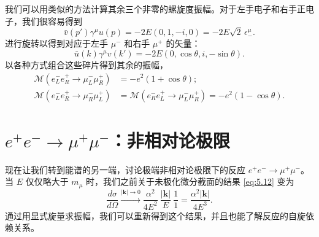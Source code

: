 我们可以用类似的方法计算其余三个非零的螺旋度振幅。对于左手电子和右手正电子，我们很容易得到
\begin{equation}
  \bar{v}(p')\gamma^\mu u(p) = -2E(0, 1, -i, 0) = -2E\sqrt{2}\,\epsilon^{\mu}_{-} .
\end{equation}
进行旋转以得到对应于左手 $\mu^{-}$ 和右手 $\mu^{+}$ 的矢量：
\begin{equation}
  \bar{u}(k)\gamma^\mu v(k') = -2E(0, \cos\theta, i, -\sin\theta) .
\end{equation}
以各种方式组合这些碎片得到其余的振幅，
\begin{equation}
  \begin{aligned}
    \mathcal{M}(e^{-}_L e^{+}_R \to \mu^{-}_L\mu^{+}_R) &= -e^2(1+\cos\theta);\\
    \mathcal{M}(e^{-}_L e^{+}_R \to \mu^{-}_R\mu^{+}_L) &=
    \mathcal{M}(e^{-}_R e^{+}_L \to \mu^{-}_L\mu^{+}_R) = -e^2(1-\cos\theta).
  \end{aligned}
  \label{eq:5.32}
\end{equation}

\section{$e^{+}e^{-}\to\mu^{+}\mu^{-}$：非相对论极限}

现在让我们转到能谱的另一端，讨论极端非相对论极限下的反应 $e^{+}e^{-}\to\mu^{+}\mu^{-}$。当 $E$ 仅仅略大于 $m_\mu$ 时，我们之前关于未极化微分截面的结果 \eqref{eq:5.12} 变为
\begin{equation}
  \frac{d\sigma}{d\Omega} \xrightarrow{|\mathbf{k}|\to 0}
    \frac{\alpha^2}{4E^2}\ \frac{|\mathbf{k}|}{E}\ \frac{1}{1}
    = \frac{\alpha^2|\mathbf{k}|}{4E^3} .
  \label{eq:5.33}
\end{equation}
通过用显式旋量求振幅，我们可以重新得到这个结果，并且也能了解反应的自旋依赖关系。

